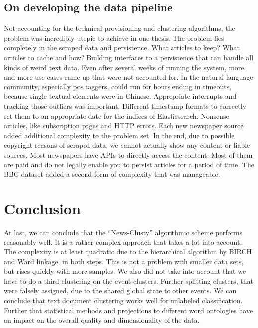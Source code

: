 \subsection*{On developing the data pipeline} 
Not accounting for the technical provisioning and clustering algorithms, the problem was incredibly utopic to achieve in one thesis. The problem lies completely in the scraped data and persistence. What articles to keep? What articles to cache and how? Building interfaces to a persistence that can handle all kinds of weird text data. Even after several weeks of running the system, more and more use cases came up that were not accounted for. In the natural language community, especially pos taggers, could run for hours ending in timeouts, because single textual elements were in Chinese. Appropriate interrupts and tracking those outliers was important. Different timestamp formats to correctly set them to an appropriate date for the indices of Elasticsearch. Nonsense articles, like subscription pages and HTTP errors. Each new newspaper source added additional complexity to the problem set. In the end, due to possible copyright reasons of scraped data, we cannot actually show any content or liable sources. Most newspapers have APIs to directly access the content. Most of them are paid and do not legally enable you to persist articles for a period of time. The BBC dataset added a second form of complexity that was manageable.


\section{Conclusion}
At last, we can conclude that the ``News-Clusty'' algorithmic scheme performs reasonably well. It is a rather complex approach that takes a lot into account. The complexity is at least quadratic due to the hierarchical algorithm by BIRCH and Ward linkage, in both steps. This is not a problem with smaller data sets, but rises quickly with more samples. We also did not take into account that we have to do a third clustering on the event clusters. Further splitting clusters, that were falsely assigned, due to the shared global state to other events. We can conclude that text document clustering works well for unlabeled classification. Further that statistical methods and projections to different word ontologies have an impact on the overall quality and dimensionality of the data. 

